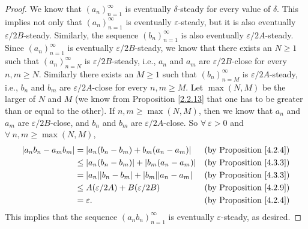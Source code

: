 \begin{proof}
    We know that \((a_n)_{n = 1}^{\infty}\) is eventually \(\delta\)-steady for every value of \(\delta\).
    This implies not only that \((a_n)_{n = 1}^{\infty}\) is eventually \(\varepsilon\)-steady, but it is also eventually \(\varepsilon / 2B\)-steady.
    Similarly, the sequence \((b_n)_{n = 1}^{\infty}\) is also eventually \(\varepsilon / 2A\)-steady.
    Since \((a_n)_{n = 1}^{\infty}\) is eventually \(\varepsilon / 2B\)-steady, we know that there exists an \(N \geq 1\) such that \((a_n)_{n = N}^{\infty}\) is \(\varepsilon / 2B\)-steady, i.e., \(a_n\) and \(a_m\) are \(\varepsilon / 2B\)-close for every \(n, m \geq N\).
    Similarly there exists an \(M \geq 1\) such that \((b_n)_{n = M}^{\infty}\) is \(\varepsilon / 2A\)-steady, i.e., \(b_n\) and \(b_m\) are \(\varepsilon / 2A\)-close for every \(n, m \geq M\).
    Let \(\max(N, M)\) be the larger of \(N\) and \(M\)
    (we know from Proposition \ref{2.2.13} that one has to be greater than or equal to the other).
    If \(n, m \geq \max(N, M)\), then we know that \(a_n\) and \(a_m\) are \(\varepsilon / 2B\)-close, and \(b_n\) and \(b_m\) are \(\varepsilon / 2A\)-close.
    So \(\forall\ \varepsilon > 0\) and \(\forall\ n, m \geq \max(N, M)\),
    \begin{align*}
        \abs*{a_n b_n - a_m b_m} & = \abs*{a_n (b_n - b_m) + b_m (a_n - a_m)}                & \text{(by Proposition \ref{4.2.4})} \\
                                 & \leq \abs*{a_n (b_n - b_m)} + \abs*{b_m (a_n - a_m)}      & \text{(by Proposition \ref{4.3.3})} \\
                                 & = \abs*{a_n}\abs*{b_n - b_m} + \abs*{b_m}\abs*{a_n - a_m} & \text{(by Proposition \ref{4.3.3})} \\
                                 & \leq A(\varepsilon / 2A) + B(\varepsilon / 2B)            & \text{(by Proposition \ref{4.2.9})} \\
                                 & = \varepsilon.                                            & \text{(by Proposition \ref{4.2.4})}
    \end{align*}
    This implies that the sequence \((a_n b_n)_{n = 1}^{\infty}\) is eventually \(\varepsilon\)-steady, as desired.


\end{proof}
